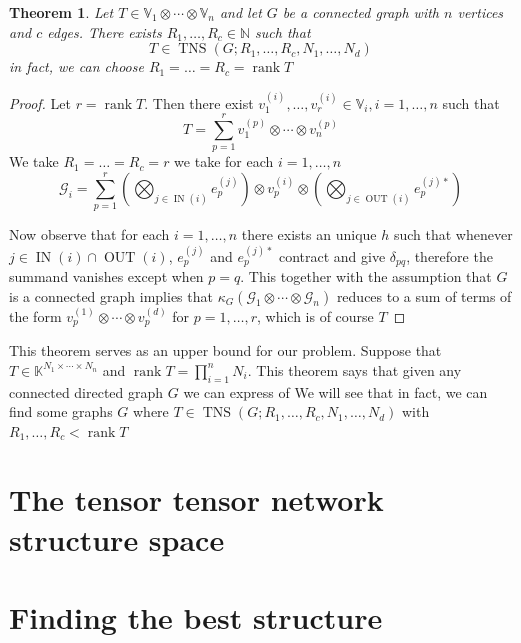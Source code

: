 \documentclass[11pt,a4paper,openright,oneside]{book}
\numberwithin{equation}{section}
\newtheorem{thm0}[defn0]{Theorem}
\newenvironment{theorem}{\bigskip \begin{thm0}}{\end{thm0}}
\DeclareMathOperator{\rank}{rank}
\DeclareMathOperator{\IN}{IN}
\DeclareMathOperator{\OUT}{OUT}
\DeclareMathOperator{\TNS}{TNS}
\begin{document}
\begin{theorem}  Let $T \in \mathbb{V}_1 \otimes \cdots \otimes \mathbb{V}_n$ and let $G$ be a connected graph with $n$ vertices and $c$ edges.
    There exists $R_1, \dots, R_c \in \mathbb{N}$ such that
    $$T \in \TNS(G; R_1, \dots, R_c, N_1, \dots, N_d)$$
    in fact, we can choose $R_1 = \dots = R_c = \rank{T}$
\end{theorem}

\begin{proof} Let $r = \rank{T}$. Then there exist $v_1^{(i)}, \dots, v_r^{(i)} \in \mathbb{V}_i, i = 1, \dots, n$ such that
    $$T = \sum_{p=1}^r v_1^{(p)} \otimes \cdots \otimes v_n^{(p)}$$
    We take $R_1 = \dots = R_c = r$ we take for each $i = 1, \dots, n$
    $$\mathcal{G}_i = \sum_{p=1}^r \left( \bigotimes\nolimits_{j \in \IN(i)} e_p^{(j)} \right) \otimes v_p^{(i)} \otimes 
    \left( \bigotimes\nolimits_{j \in \OUT(i)} e_p^{(j)*} \right)$$

    Now observe that for each $i = 1, \dots, n$ there exists an unique $h$ such that whenever $j \in \IN(i)\cap \OUT(i)$,
    $e_p^{(j)}$ and $e_p^{(j)*}$ contract and give $\delta_{pq}$, therefore the summand vanishes except when $p = q$.
    This together with the assumption that $G$ is a connected graph implies that $\kappa_G(\mathcal{G}_1 \otimes \cdots \otimes \mathcal{G}_n)$ reduces
    to a sum of terms of the form $v_p^{(1)} \otimes \cdots \otimes v_p^{(d)}$ for $p = 1, \dots, r$, which is of course $T$
\end{proof}

This theorem serves as an upper bound for our problem.
Suppose that $T \in \mathbb{K}^{N_1 \times \cdots \times N_n}$ and $\rank T = \prod_{i=1}^n N_i$. This theorem says that given any connected
directed graph $G$ we can express of 
We will see that in fact, we can find some graphs $G$ where $T \in \TNS(G; R_1, \dots, R_c, N_1, \dots, N_d)$
with $R_1, \dots, R_c < \rank{T}$

\section{The tensor tensor network structure space}

\section{Finding the best structure}


\cite{liPermutationSearchTensor2022}
\end{document}
